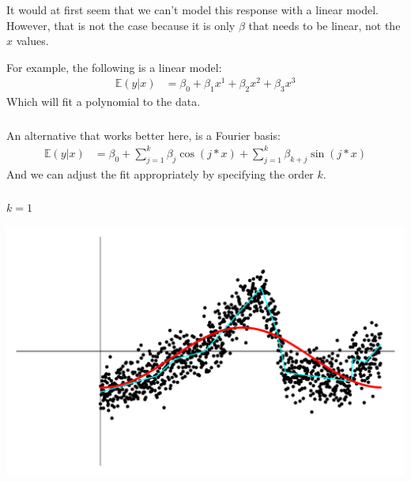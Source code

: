\begin{frame}[fragile] \frametitle{}

It would at first seem that we can't model this response with a linear
model. However, that is not the case because it is only $\beta$ that needs to be
linear, not the $x$ values. \pause

For example, the following is a linear model:
\begin{align*}
\mathbb{E} (y | x) &= \beta_0 + \beta_1 x^1 + \beta_2 x^2 + \beta_3 x^3
\end{align*}
Which will fit a polynomial to the data.

\end{frame}

\begin{frame}[fragile] \frametitle{}

An alternative that works better here, is a Fourier basis:
\begin{align*}
\mathbb{E} (y | x) &= \beta_0 + \sum_{j=1}^{k} \beta_j \cos (j * x) + \sum_{j=1}^k \beta_{k+j} \sin (j * x)
\end{align*}
And we can adjust the fit appropriately by specifying the
order $k$.

\end{frame}


\begin{frame}[fragile] \frametitle{}

$k=1$

\includegraphics[width=\linewidth]{img/fig06.pdf}

\end{frame}


